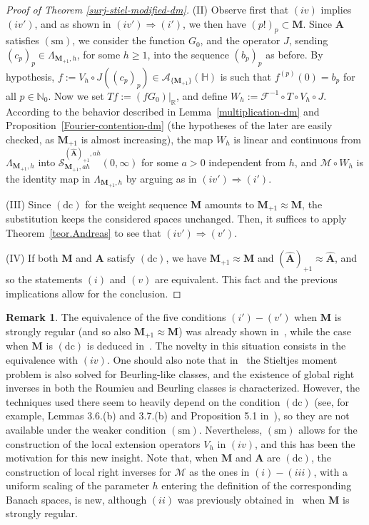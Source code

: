 \documentclass[12pt,a4paper]{article}
\newcommand{\N}{\mathbb{N}}
\newcommand{\R}{\mathbb{R}}
\newcommand{\HH}{\mathbb{H}}
\newcommand{\M}{{\boldsymbol{M}}}
\newcommand{\A}{{\boldsymbol{A}}}
\newcommand{\hA}{\widehat{{\boldsymbol{A}}}}
\newcommand{\dc}{\operatorname{(dc)}}
\newcommand{\sm}{\operatorname{(sm)}}
\theoremstyle{plain}
\theoremstyle{definition}
\newtheorem{remark}[theorem]{Remark}
\numberwithin{equation}{section}
\begin{document}
\begin{proof}[Proof of Theorem \ref{surj-stiel-modified-dm}]
(II) Observe first that $(iv)$ implies $(iv')$, and as shown in $(iv')\Rightarrow(i')$, we then have $(p!)_p\subset\M$. Since $\A$ satisfies $\sm$, we consider the function $G_0$, and the operator $J$, sending $(c_p)_{p} \in \Lambda_{\M_{+1},h}$, for some $h\ge 1$, into the sequence $(b_p)_p$ as before. By hypothesis, $f:=V_h\circ J((c_p)_p)\in\mathcal{A}_{\{\M_{+1}\}}(\HH)$ is such that $f^{(p)}(0) = b_p$ for all $p \in \N_0$. Now we set $Tf:=(fG_0)|_{\R}$, and define $W_h:=\mathcal{F}^{-1}\circ T\circ V_h\circ J$. According to the behavior described in Lemma~\ref{multiplication-dm} and Proposition~\ref{Fourier-contention-dm} (the hypotheses of the later are easily checked, as $\M_{+1}$ is almost increasing), the map $W_h$ is linear and continuous from $\Lambda_{\M_{+1},h}$ into $\mathcal{S}^{(\hA)_{+1},ah}_{\M_{+1},ah}(0,\infty)$ for some $a>0$ independent from $h$, and $\mathcal{M}\circ W_h$ is the identity map in $\Lambda_{\M_{+1},h}$ by arguing as in $(iv')\Rightarrow(i')$.

(III) Since $\dc$ for the weight sequence $\M$ amounts to $\M_{+1}\approx\M$, the substitution keeps the considered spaces unchanged. Then, it suffices to apply Theorem~\ref{teor.Andreas} to see that $(iv')\Rightarrow(v')$.

(IV) If both  $\M$ and $\A$ satisfy $\dc$, we have $\M_{+1}\approx\M$ and $(\hA)_{+1}\approx\hA$, and so the statements $(i)$ and $(v)$ are equivalent. This fact and the previous implications allow for the conclusion.
\end{proof}

\begin{remark}
The equivalence of the five conditions  $(i')-(v')$ when $\M$ is strongly regular (and so also $\M_{+1}\approx\M$) was already shown in~\cite[Thm. 3.5]{DebrouwereetalMoment}, while the case when $\M$ is $\dc$ is deduced in~\cite[Thm. 6.1.(b) and Thm. 7.2.(b)]{momentsdebrouwere}. The novelty in this situation consists in the equivalence with $(iv)$. One should also note that in~\cite{momentsdebrouwere} the Stieltjes moment problem is also solved for Beurling-like classes, and the existence of global right inverses in both the Roumieu and Beurling classes is characterized. However, the techniques used there seem to heavily depend on the condition $\dc$ (see, for example, Lemmas 3.6.(b) and 3.7.(b) and Proposition 5.1 in~\cite{momentsdebrouwere}), so they are not available under the weaker condition $\sm$. Nevertheless, $\sm$ allows for the construction of the local extension operators $V_{h}$ in $(iv)$, and this has been the motivation for this new insight. Note that, when $\M$ and $\A$ are $\dc$, the construction of local right inverses for $\mathcal{M}$ as the ones in $(i)-(iii)$, with a uniform scaling of the parameter $h$ entering the definition of the corresponding Banach spaces, is new, although $(ii)$ was previously obtained in~\cite{L-S09} when $\M$ is strongly regular.
\end{remark}
\end{document}

